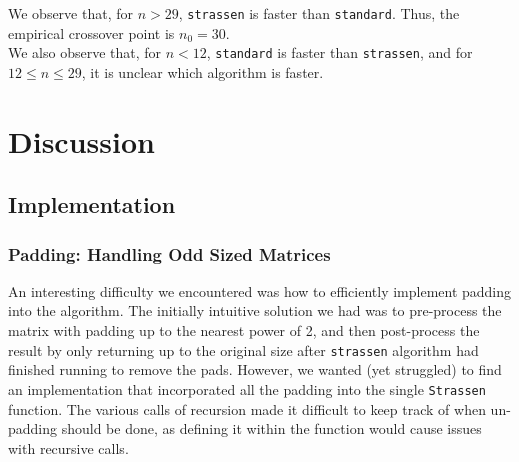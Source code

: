 \documentclass[11pt]{scrartcl}
\theoremstyle{dotlessP}
\theoremstyle{dotlessN}
\theoremstyle{dotN}
\begin{document}
We observe that, for $n > 29$, \texttt{strassen} is faster than \texttt{standard}. Thus, the empirical crossover point is $n_0 = 30$. 
\\

We also observe that, for $n < 12$, \texttt{standard} is faster than \texttt{strassen}, and for $12 \leq n \leq 29$, it is unclear which algorithm is faster.
\section{Discussion}
\subsection{Implementation}
\subsubsection{Padding: Handling Odd Sized Matrices}
An interesting difficulty we encountered was how to efficiently implement padding into the algorithm. The initially intuitive solution we had was to pre-process the matrix with padding up to the nearest power of 2, and then post-process the result by only returning up to the original size after \texttt{strassen} algorithm had finished running to remove the pads. However, we wanted (yet struggled) to find an implementation that incorporated all the padding into the single \texttt{Strassen} function. The various calls of recursion made it difficult to keep track of when un-padding should be done, as defining it within the function would cause issues with recursive calls. \\
\end{document}
